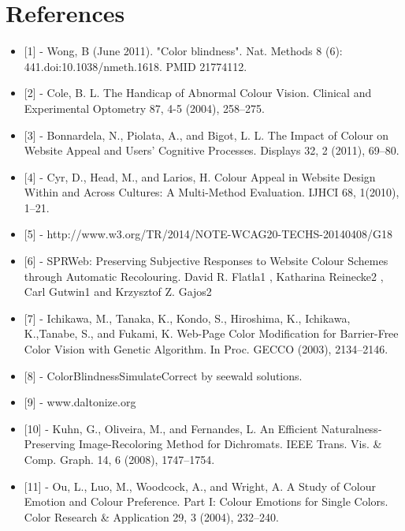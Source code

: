 \chapter{References}
\thispagestyle{plain}

\label{References}

\begin{itemize}

\item{[1]} - Wong, B (June 2011). "Color blindness". Nat. Methods 8 (6): 441.doi:10.1038/nmeth.1618. PMID
21774112.

\item{[2]} - Cole, B. L. The Handicap of Abnormal Colour Vision. Clinical and Experimental Optometry 87, 4-5
(2004), 258–275.

\item{[3]} - Bonnardela, N., Piolata, A., and Bigot, L. L. The Impact of Colour on Website Appeal and Users’
Cognitive Processes. Displays 32, 2 (2011), 69–80.

\item{[4]} - Cyr, D., Head, M., and Larios, H. Colour Appeal in Website Design Within and Across Cultures: A
Multi-Method Evaluation. IJHCI 68, 1(2010), 1–21.

\item{[5]} - http://www.w3.org/TR/2014/NOTE-WCAG20-TECHS-20140408/G18

\item{[6]} - SPRWeb: Preserving Subjective Responses to Website Colour Schemes through Automatic
Recolouring. David R. Flatla1 , Katharina Reinecke2 , Carl Gutwin1 and Krzysztof Z. Gajos2

\item{[7]} - Ichikawa, M., Tanaka, K., Kondo, S., Hiroshima, K., Ichikawa, K.,Tanabe, S., and Fukami, K.
Web-Page Color Modification for Barrier-Free Color Vision with Genetic Algorithm. In Proc. GECCO
(2003), 2134–2146.

\item{[8]} - ColorBlindnessSimulateCorrect by seewald solutions.

\item{[9]} - www.daltonize.org

\item{[10]} - Kuhn, G., Oliveira, M., and Fernandes, L. An Efficient Naturalness-Preserving Image-Recoloring
Method for Dichromats. IEEE Trans. Vis. \& Comp. Graph. 14, 6 (2008), 1747–1754.

\item{[11]} - Ou, L., Luo, M., Woodcock, A., and Wright, A. A Study of Colour Emotion and Colour
Preference. Part I: Colour Emotions for Single Colors. Color Research \& Application 29, 3 (2004),
232–240.


\end{itemize}
